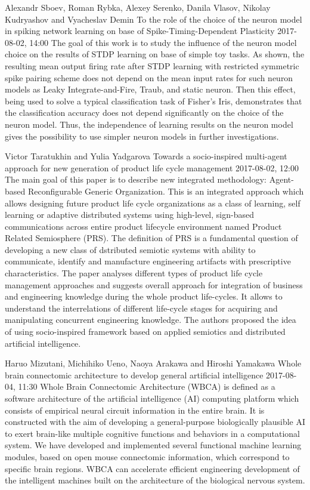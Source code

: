 \documentclass[10pt,fleqn,openany]{book} %
\begin{document}
\begin{enumerate}
		
		\paperabstract
		{Alexandr Sboev, Roman Rybka, Alexey Serenko, Danila Vlasov, Nikolay Kudryashov and Vyacheslav Demin}
		{To the role of the choice of the neuron model in spiking network learning on base of Spike-Timing-Dependent Plasticity}
		{2017-08-02, 14:00}
		{The goal of this work is to study the influence of the neuron model choice on the results of STDP learning on base of simple toy tasks. As shown, the resulting mean output firing rate after STDP learning with restricted symmetric spike pairing scheme does not depend on the mean input rates for such neuron models  as Leaky Integrate-and-Fire, Traub, and static neuron. Then this effect, being used to solve a typical classification task of Fisher's Iris, demonstrates that the classification accuracy does not depend significantly on the choice of the neuron model. Thus, the independence of learning results on the neuron model  gives the possibility to use simpler neuron models in further investigations.}
		
		
		\paperabstract
		{Victor Taratukhin and Yulia Yadgarova}
		{Towards a socio-inspired multi-agent approach for new generation of product life cycle management}
		{2017-08-02, 12:00}
		{The main goal of this paper is to describe new integrated methodology: Agent-based Reconfigurable Generic Organization. This is an integrated approach which allows designing future product life cycle organizations as a class of learning, self learning or adaptive distributed systems using high-level, sign-based communications across entire product lifecycle environment named Product Related Semiosphere (PRS). The definition of PRS is a fundamental question of developing a new class of dstributed semiotic systems with ability to communicate, identify and manufacture engineering artifacts with prescriptive characteristics. The paper analyses different types of product life cycle management approaches and suggests overall approach for integration of business and engineering knowledge during the whole product life-cycles. It allows to understand the interrelations of different life-cycle stages for acquiring and manipulating concurrent engineering knowledge. The authors proposed the idea of using socio-inspired framework based on applied semiotics and distributed artificial intelligence.}
		
		
		\paperabstract
		{Haruo Mizutani, Michihiko Ueno, Naoya Arakawa and Hiroshi Yamakawa}
		{Whole brain connectomic architecture to develop general artificial intelligence}
		{2017-08-04, 11:30}
		{Whole Brain Connectomic Architecture (WBCA) is defined as a software architecture of the artificial intelligence (AI) computing platform which consists of empirical neural circuit information in the entire brain. It is constructed with the aim of developing a general-purpose biologically plausible AI to exert brain-like multiple cognitive functions and behaviors in a computational system. We have developed and implemented several functional machine learning modules, based on open mouse connectomic information, which correspond to specific brain regions. WBCA can accelerate efficient engineering development of the intelligent machines built on the architecture of the biological nervous system.}
		

\end{enumerate}
\end{document}
